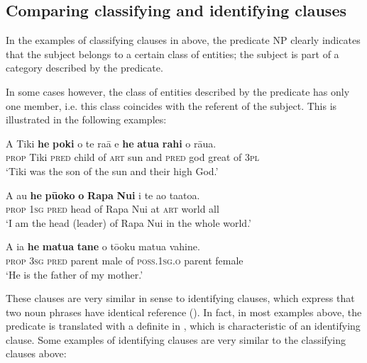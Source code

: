 \subsection{Comparing classifying and identifying clauses}\label{sec:9.2.3}

In the examples of classifying clauses in  above, the predicate NP clearly indicates that the subject belongs to a certain class of entities; the subject is part of a category described by the predicate. 

In some cases however, the class of entities described by the predicate has only one member, i.e. this class coincides with the referent of the subject. This is illustrated in the following examples:

\ea\label{ex:9.20}
\gll A Tiki \textbf{he} \textbf{poki} o te ra{\ꞌ}ā {\ꞌ}e \textbf{he} \textbf{{\ꞌ}atua} \textbf{rahi} o rāua. \\
\textsc{prop} Tiki \textsc{pred} child of \textsc{art} sun and \textsc{pred} god great of \textsc{3pl} \\

\glt 
‘Tiki was the son of the sun and their high God.’ \textstyleExampleref{[R376.027]} 
\z

\ea\label{ex:9.21}
\gll A au \textbf{he} \textbf{pū{\ꞌ}oko} \textbf{o} \textbf{Rapa} \textbf{Nui} {\ꞌ}i te ao ta{\ꞌ}ato{\ꞌ}a. \\
\textsc{prop} \textsc{1sg} \textsc{pred} head of Rapa Nui at \textsc{art} world all \\

\glt 
‘I am the head (leader) of Rapa Nui in the whole world.’ \textstyleExampleref{[R648.290]} 
\z

\ea\label{ex:9.22}
\gll A ia \textbf{he} \textbf{matu{\ꞌ}a} \textbf{tane} o tō{\ꞌ}oku matu{\ꞌ}a vahine. \\
\textsc{prop} \textsc{3sg} \textsc{pred} parent male of \textsc{poss.1sg.o} parent female \\

\glt
‘He is the father of my mother.’ \textstyleExampleref{[R487.040]} 
\z

These clauses are very similar in sense to identifying clauses, which express that two noun phrases have identical reference (). In fact, in most examples above, the predicate is translated with a definite  in , which is characteristic of an identifying clause. Some examples of identifying clauses are very similar to the classifying clauses above:


